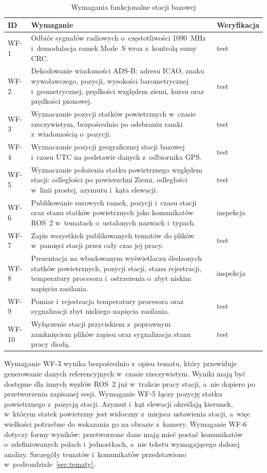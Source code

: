 \begin{table}[!htb]
  \centering
  \caption{Wymagania funkcjonalne stacji bazowej}
  \label{tab:wf}
  \small
  \begin{tabular}{>{\raggedright}p{1.2cm} >{\raggedright}p{11.4cm} >{\raggedright\arraybackslash}p{1.9cm}}
    \toprule
    ID & Wymaganie & Weryfikacja \\
    \midrule
    WF-1 & Odbiór sygnałów radiowych o~częstotliwości \SI{1090}{\mega\hertz} i~demodulacja ramek Mode~S wraz z~kontrolą sumy CRC. & test \\
    WF-2 & Dekodowanie wiadomości ADS-B: adresu ICAO, znaku wywoławczego, pozycji, wysokości barometrycznej i~geometrycznej, prędkości względem ziemi, kursu oraz prędkości pionowej. & test \\
    WF-3 & Wyznaczanie pozycji statków powietrznych w~czasie rzeczywistym, bezpośrednio po odebraniu ramki z~wiadomością o~pozycji. & test \\
    WF-4 & Wyznaczanie pozycji geograficznej stacji bazowej i~czasu UTC na podstawie danych z~odbiornika GPS. & test \\
    WF-5 & Wyznaczanie położenia statku powietrznego względem stacji: odległości po powierzchni Ziemi, odległości w~linii prostej, azymutu i~kąta elewacji. & test \\
    WF-6 & Publikowanie surowych ramek, pozycji i~czasu stacji oraz stanu statków powietrznych jako komunikatów ROS~2 w~tematach o~ustalonych nazwach i~typach. & inspekcja \\
    WF-7 & Zapis wszystkich publikowanych tematów do plików w~pamięci stacji przez cały czas jej pracy. & test \\
    WF-8 & Prezentacja na wbudowanym wyświetlaczu śledzonych statków powietrznych, pozycji stacji, stanu rejestracji, temperatury procesora i~ostrzeżenia o~zbyt niskim napięciu zasilania. & inspekcja \\
    WF-9 & Pomiar i~rejestracja temperatury procesora oraz sygnalizacji zbyt niskiego napięcia zasilania. & test \\
    WF-10 & Wyłączenie stacji przyciskiem z~poprawnym zamknięciem plików zapisu oraz sygnalizacja stanu pracy diodą. & test \\
    \bottomrule
  \end{tabular}
\end{table}

Wymaganie WF-3 wynika bezpośrednio z~opisu tematu, który przewiduje generowanie danych referencyjnych w~czasie rzeczywistym. Wyniki mają być dostępne dla innych węzłów ROS~2 już w~trakcie pracy stacji, a~nie dopiero po przetworzeniu zapisanej sesji. Wymaganie WF-5 łączy pozycję statku powietrznego z~pozycją stacji. Azymut i~kąt elewacji określają kierunek, w~którym statek powietrzny jest widoczny z~miejsca ustawienia stacji, a~więc wielkości potrzebne do wskazania go na obrazie z~kamery. Wymaganie WF-6 dotyczy formy wyników: przetworzone dane mają mieć postać komunikatów o~zdefiniowanych polach i~jednostkach, a~nie tekstu wymagającego dalszej analizy. Szczegóły tematów i~komunikatów przedstawiono w~podrozdziale~\ref{sec:tematy}.

